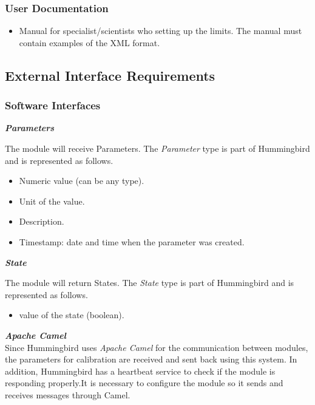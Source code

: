 \subsubsection{User Documentation}
\begin{itemize}
\item Manual for specialist/scientists who setting up the limits. The manual must contain examples of the XML format.
\end{itemize}

\subsection{External Interface Requirements}

\subsubsection{Software Interfaces}

\textbf{\emph{Parameters}}

The module will receive Parameters. The \emph{Parameter} type is part of Hummingbird and is represented as follows.

\begin{itemize}
\item Numeric value (can be any type).
\item Unit of the value.
\item Description.
\item Timestamp: date and time when the parameter was created.

\end{itemize}


\textbf{\emph{State}}

The module will return States. The \emph{State} type is part of Hummingbird and is represented as follows.

\begin{itemize}
\item value of the state (boolean).

\end{itemize}

\textbf{\emph{Apache Camel}}\citep{Camel}\\
Since Hummingbird uses \emph{Apache Camel} for the communication between modules, the parameters for calibration are received and sent back using this system. In addition, Hummingbird has a heartbeat service to check if the module is responding properly.It is necessary to configure the module so it sends and receives messages through Camel.


